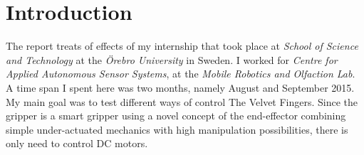 \section{Introduction}
The report treats of effects of my internship that took place at \textit{School of Science and Technology} at the \textit{Örebro University} in Sweden. I worked for \textit{Centre for Applied Autonomous Sensor Systems}, at the \textit{Mobile Robotics and Olfaction Lab}. A time span I spent here was two months, namely August and September 2015. My main goal was to test different ways of control \textsf{The Velvet Fingers}. Since the gripper is a smart gripper using a novel concept of the end-effector combining simple under-actuated mechanics with high manipulation possibilities, there is only need to control DC motors.